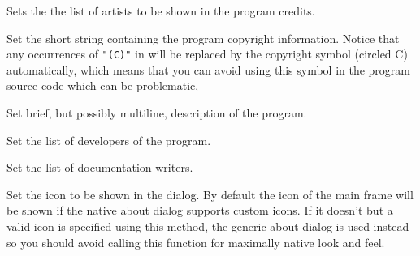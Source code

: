 \label{wxaboutdialoginfosetartists}


Sets the the list of artists to be shown in the program credits.




\label{wxaboutdialoginfosetcopyright}


Set the short string containing the program copyright information. Notice that
any occurrences of \texttt{"(C)"} in  will be replaced by the
copyright symbol (circled C) automatically, which means that you can avoid
using this symbol in the program source code which can be problematic,


\label{wxaboutdialoginfosetdescription}


Set brief, but possibly multiline, description of the program.


\label{wxaboutdialoginfosetdevelopers}


Set the list of developers of the program.




\label{wxaboutdialoginfosetdocwriters}


Set the list of documentation writers.




\label{wxaboutdialoginfoseticon}


Set the icon to be shown in the dialog. By default the icon of the main frame
will be shown if the native about dialog supports custom icons. If it doesn't
but a valid icon is specified using this method, the generic about dialog is
used instead so you should avoid calling this function for maximally native
look and feel.


